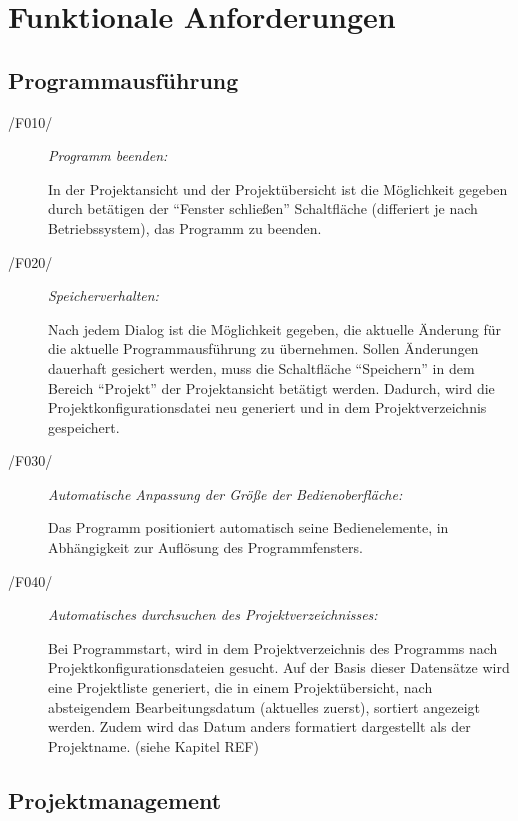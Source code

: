 \section{Funktionale Anforderungen}

\subsection{Programmausführung}

\label{subsec:programmausfuehrung}

	\begin{description}
		
		\item[/F010/] \textit{Programm beenden:}\par In der Projektansicht und der Projektübersicht ist die Möglichkeit gegeben durch betätigen der "`Fenster schließen"' Schaltfläche (differiert je nach Betriebssystem), das Programm zu beenden.
		
		\item[/F020/] \textit{Speicherverhalten:}\par Nach jedem Dialog ist die Möglichkeit gegeben, die aktuelle Änderung für die aktuelle Programmausführung zu übernehmen. Sollen Änderungen dauerhaft gesichert werden, muss die Schaltfläche "`Speichern"' in dem Bereich "`Projekt"' der Projektansicht betätigt werden. Dadurch, wird die Projektkonfigurationsdatei neu generiert und in dem Projektverzeichnis gespeichert.
		
		\item[/F030/] \textit{Automatische Anpassung der Größe der Bedienoberfläche:}\par Das Programm positioniert automatisch seine Bedienelemente, in Abhängigkeit zur Auflösung des Programmfensters.
		
		\item[/F040/] \textit{Automatisches durchsuchen des Projektverzeichnisses:}\par Bei Programmstart, wird in dem Projektverzeichnis des Programms nach Projektkonfigurationsdateien gesucht. Auf der Basis dieser Datensätze wird eine Projektliste generiert, die in einem Projektübersicht, nach absteigendem Bearbeitungsdatum (aktuelles zuerst), sortiert angezeigt werden. Zudem wird das Datum anders formatiert dargestellt als der Projektname. (siehe Kapitel REF)
		
	\end{description}

\subsection{Projektmanagement}

